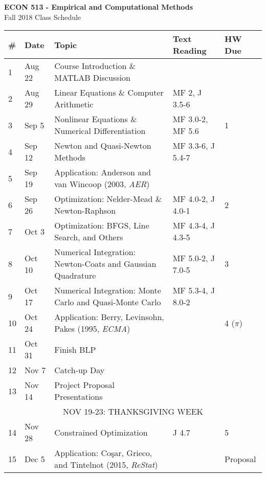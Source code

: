 \documentclass{article}
\begin{document}
\begin{center}
{\bf ECON 513 - Empirical and Computational Methods} \\
Fall 2018 Class Schedule 
\end{center}

\begin{center}
\begin{tabular}{l  l | l | l | l  }
\toprule
\# & Date & Topic & Text Reading & HW Due \\
\bottomrule
1 & Aug 22 & Course Introduction \& MATLAB Discussion &  & \\
2 & Aug 29 & Linear Equations \& Computer Arithmetic & MF 2, J 3.5-6 \\
3 & Sep 5  &  Nonlinear Equations \& Numerical Differentiation & MF 3.0-2, MF 5.6  & 1 \\ 
4 & Sep 12 & Newton and Quasi-Newton Methods & MF 3.3-6, J 5.4-7  & \\
5 & Sep 19 & Application: Anderson and van Wincoop (2003, \emph{AER})  &   \\
6 & Sep 26 & Optimization: Nelder-Mead \& Newton-Raphson & MF 4.0-2, J 4.0-1 & 2 \\
7 & Oct 3 & Optimization: BFGS, Line Search, and Others & MF 4.3-4, J 4.3-5 \\
8 & Oct 10 & Numerical Integration: Newton-Coats and Gaussian Quadrature & MF 5.0-2, J 7.0-5 & 3 \\
9 & Oct 17 & Numerical Integration: Monte Carlo and Quasi-Monte Carlo  & MF 5.3-4, J 8.0-2 &  \\
10 & Oct 24 & Application: Berry, Levinsohn, Pakes (1995, \emph{ECMA})  &  & 4 ($\pi$)\\
11 & Oct 31 & Finish BLP & &  \\
12 & Nov 7 & Catch-up Day &   & \\
13 & Nov 14 & Project Proposal Presentations &  & \\ 
\multicolumn{5}{c}{NOV 19-23: THANKSGIVING WEEK } \\
14 & Nov 28 &  Constrained Optimization & J 4.7 & 5  \\
15 & Dec 5   & Application:  Co\c{s}ar, Grieco, and Tintelnot (2015, \emph{ReStat}) &  & Proposal \\
\bottomrule
\end{tabular}
\end{center}
\end{document}

